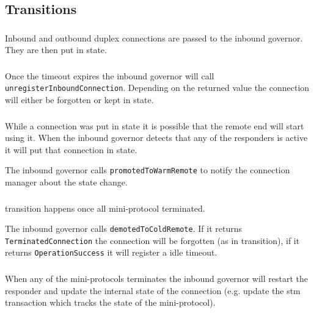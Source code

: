 \subsection{Transitions}

\subsubsection{\NewConnection}
Inbound and outbound duplex connections are passed to the inbound governor.
They are then put in \RemoteIdle{} state.

\subsubsection{\CommitRemote}
Once the \RemoteIdle{} timeout expires the inbound governor will call
\texttt{unregisterInboundConnection}.  Depending on the returned value the
connection will either be forgotten or kept in \RemoteCold{} state.

\subsubsection{\AwakeRemote}
While a connection was put in \RemoteIdle{} state it is possible that the
remote end will start using it.  When the inbound governor detects that any
of the responders is active it will put that connection in \RemoteWarm{} state.

\begin{detail}
  The inbound governor calls \texttt{promotedToWarmRemote} to notify the
  connection manager about the state change.
\end{detail}

\subsubsection{\WaitIdleRemote}
\WaitIdleRemote{} transition happens once all mini-protocol terminated.

\begin{detail}
  The inbound governor calls \texttt{demotedToColdRemote}.   If it returns
  \texttt{TerminatedConnection} the connection will be forgotten (as in
  \MuxTerminated{} transition), if it returns \texttt{OperationSuccess} it will
  register a idle timeout.
\end{detail}

\subsubsection{\MiniProtocolTerminated}
When any of the mini-protocols terminates the inbound governor will restart the
responder and update the internal state of the connection (e.g. update the stm
transaction which tracks the state of the mini-protocol).

